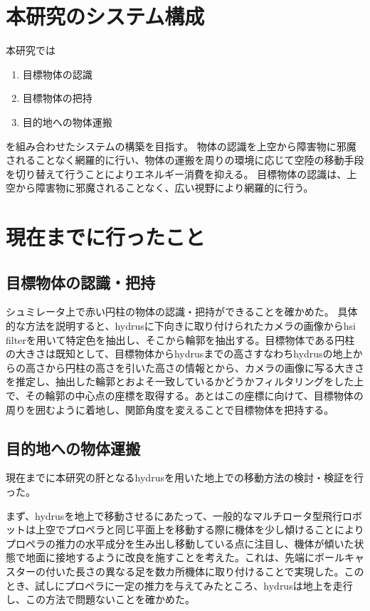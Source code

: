 \documentclass[twocolumn]{preport}
\begin{document}
\section{本研究のシステム構成}
本研究では
\begin{enumerate}
\item 目標物体の認識
\item 目標物体の把持
\item 目的地への物体運搬
\end{enumerate}
を組み合わせたシステムの構築を目指す。
物体の認識を上空から障害物に邪魔されることなく網羅的に行い、物体の運搬を周りの環境に応じて空陸の移動手段を切り替えて行うことによりエネルギー消費を抑える。
目標物体の認識は、上空から障害物に邪魔されることなく、広い視野により網羅的に行う。

\section{現在までに行ったこと}
\subsection{目標物体の認識・把持}
シュミレータ上で赤い円柱の物体の認識・把持ができることを確かめた。
具体的な方法を説明すると、hydrusに下向きに取り付けられたカメラの画像からhsi filterを用いて特定色を抽出し、そこから輪郭を抽出する。目標物体である円柱の大きさは既知として、目標物体からhydrusまでの高さすなわちhydrusの地上からの高さから円柱の高さを引いた高さの情報とから、カメラの画像に写る大きさを推定し、抽出した輪郭とおよそ一致しているかどうかフィルタリングをした上で、その輪郭の中心点の座標を取得する。あとはこの座標に向けて、目標物体の周りを囲むように着地し、関節角度を変えることで目標物体を把持する。

\subsection{目的地への物体運搬}
現在までに本研究の肝となるhydrusを用いた地上での移動方法の検討・検証を行った。

まず、hydrusを地上で移動させるにあたって、一般的なマルチロータ型飛行ロボットは上空でプロペラと同じ平面上を移動する際に機体を少し傾けることによりプロペラの推力の水平成分を生み出し移動している点に注目し、機体が傾いた状態で地面に接地するように改良を施すことを考えた。これは、先端にボールキャスターの付いた長さの異なる足を数カ所機体に取り付けることで実現した。このとき、試しにプロペラに一定の推力を与えてみたところ、hydrusは地上を走行し、この方法で問題ないことを確かめた。
\end{document}
